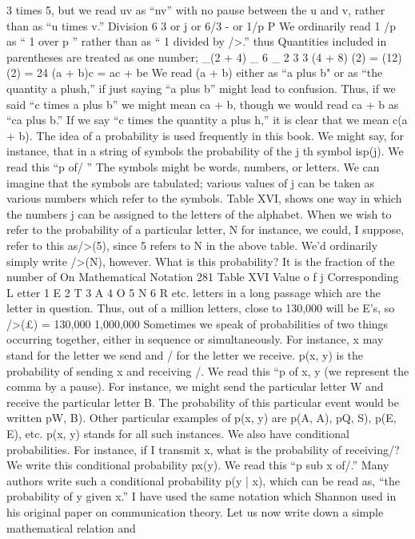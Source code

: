 {{{{{{{{{{{{3 times 5, but we read uv as “nv” with no pause between the u and
v, rather than as “u times v.”
Division
6 3 or j or 6/3
- or 1/p
P
We ordinarily read 1 /p as “ 1 over p ” rather than as “ 1 divided
by />.”
thus
Quantities included in parentheses are treated as one number;
_(2 + 4) _ 6 _ 2
3 3
(4 + 8) (2) = (12) (2) = 24
(a + b)c = ac + be
We read (a + b) either as “a plus b" or as “the quantity a plush,”
if just saying “a plus b” might lead to confusion. Thus, if we said
“c times a plus b” we might mean ca + b, though we would read
ca + b as “ca plus b.” If we say “c times the quantity a plus h,” it
is clear that we mean c(a + b).
The idea of a probability is used frequently in this book. We
might say, for instance, that in a string of symbols the probability
of the j th symbol isp(j). We read this “p of/ ”
The symbols might be words, numbers, or letters. We can
imagine that the symbols are tabulated; various values of j can be
taken as various numbers which refer to the symbols. Table XVI,
shows one way in which the numbers j can be assigned to the letters
of the alphabet.
When we wish to refer to the probability of a particular letter, N
for instance, we could, I suppose, refer to this as/>(5), since 5 refers
to N in the above table. We’d ordinarily simply write />(N),
however.
What is this probability? It is the fraction of the number of
On Mathematical Notation 281
Table XVI
Value o f j Corresponding L etter
1 E
2 T
3 A
4 O
5 N
6 R
etc.
letters in a long passage which are the letter in question. Thus, out
of a million letters, close to 130,000 will be E’s, so
/>(£) = 130,000
1,000,000
Sometimes we speak of probabilities of two things occurring
together, either in sequence or simultaneously. For instance, x may
stand for the letter we send and / for the letter we receive. p(x, y)
is the probability of sending x and receiving /. We read this “p of
x, y (we represent the comma by a pause). For instance, we might
send the particular letter W and receive the particular letter B. The
probability of this particular event would be written p{W, B).
Other particular examples of p(x, y) are p(A, A), p{Q, S), p(E, E),
etc. p(x, y) stands for all such instances.
We also have conditional probabilities. For instance, if I transmit
x, what is the probability of receiving/? We write this conditional
probability px(y). We read this “p sub x of/.” Many authors write
such a conditional probability p(y | x), which can be read as, “the
probability of y given x.” I have used the same notation which
Shannon used in his original paper on communication theory.
Let us now write down a simple mathematical relation and
}}}}}}}}}}}}}}

